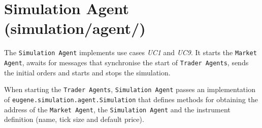 \section{Simulation Agent (simulation/agent/)}
\label{Chapters/Implementation/Simulation-Agent}
The \texttt{Simulation Agent} implements use cases \textit{UC1} and \textit{UC9}. It starts the \texttt{Market Agent}, awaits for messages that synchronise the start of \texttt{Trader Agents}, sends the initial orders and starts and stops the simulation. 

When starting the \texttt{Trader Agents}, \texttt{Simulation Agent} passes an implementation of \texttt{eugene.simulation.agent.Simulation} that defines methods for obtaining the address of the \texttt{Market Agent}, the \texttt{Simulation Agent} and the instrument definition (name, tick size and default price).
